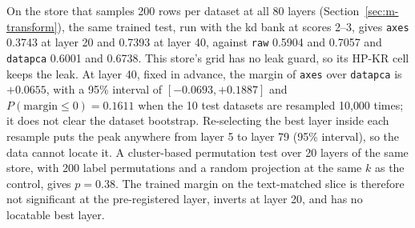 On the store that samples 200 rows per dataset at all 80 layers (Section~\ref{sec:m-transform}), the same trained test, run with the kd bank at scores 2--3, gives \texttt{axes} 0.3743 at layer 20 and 0.7393 at layer 40, against \texttt{raw} 0.5904 and 0.7057 and \texttt{datapca} 0.6001 and 0.6738. %
This store's grid has no leak guard, so its HP-KR cell keeps the leak. %
At layer 40, fixed in advance, the margin of \texttt{axes} over \texttt{datapca} is $+0.0655$, with a 95\% interval of $[-0.0693, +0.1887]$ and $P(\text{margin} \le 0) = 0.1611$ when the 10 test datasets are resampled 10{,}000 times; it does not clear the dataset bootstrap. %
Re-selecting the best layer inside each resample puts the peak anywhere from layer 5 to layer 79 (95\% interval), so the data cannot locate it. %
A cluster-based permutation test over 20 layers of the same store, with 200 label permutations and a random projection at the same $k$ as the control, gives $p=0.38$. %
The trained margin on the text-matched slice is therefore not significant at the pre-registered layer, inverts at layer 20, and has no locatable best layer. %


